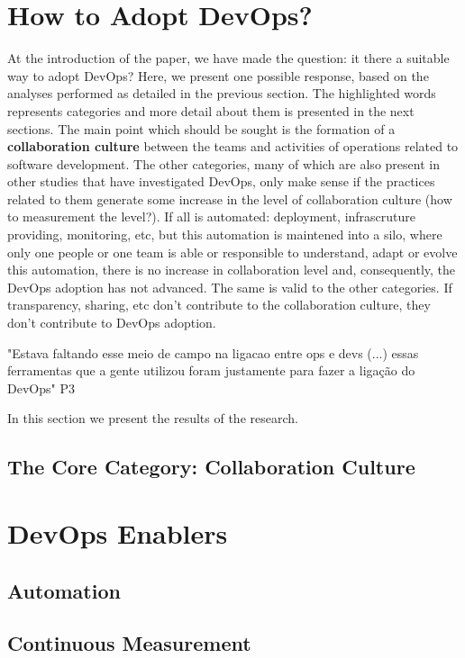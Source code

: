 \section{How to Adopt DevOps?}

At the introduction of the paper, we have made the question: it there a
suitable way to adopt DevOps? Here, we present one possible response, based
on the analyses performed as detailed in the previous section. The highlighted
words represents categories and more detail about them is presented in the next
sections. The main point which should be sought is the formation of a
\textbf{collaboration culture} between the teams and activities of operations
related to software development. The other categories, many of which are also
present in other studies that have investigated DevOps, only make sense if
the practices related to them generate some increase in the level of
collaboration culture (how to measurement the level?). If all is automated:
deployment, infrascruture providing, monitoring, etc, but this automation is
maintened into a silo, where only one people or one team is able or responsible
to understand, adapt or evolve this automation, there is no increase in
collaboration level and, consequently, the DevOps adoption has not advanced.
The same is valid to the other categories. If transparency, sharing, etc don't
contribute to the collaboration culture, they don't contribute to DevOps
adoption.

"Estava faltando esse meio de campo na ligacao entre ops e devs (...) essas
ferramentas que a gente utilizou foram justamente para fazer a ligação do
DevOps" P3

In this section we present the results of the research.

\subsection{The Core Category: Collaboration Culture}

\section{DevOps Enablers}

\subsection{Automation}

\subsection{Continuous Measurement}


